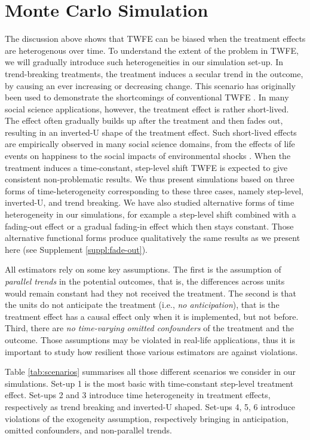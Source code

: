 \section{Monte Carlo Simulation}

The discussion above shows that TWFE can be biased when the treatment effects are heterogenous over time. To understand the extent of the problem in TWFE, we will gradually introduce such heterogeneities in our simulation set-up. In trend-breaking treatments, the treatment induces a secular trend in the outcome, by causing an ever increasing or decreasing change. This scenario has originally been used to demonstrate the shortcomings of conventional TWFE \cite{Callaway.2020,Goodman-Bacon.2021}. In many social science applications, however, the treatment effect is rather short-lived. The effect often gradually builds up after the treatment and then fades out, resulting in an inverted-U shape of the treatment effect. Such short-lived effects are empirically observed in many social science domains, from the effects of life events on happiness \cite{Bernardi.2017, Kratz.2020a, Clark.2013} to the social impacts of environmental shocks \cite{Baccini.2021, ConteKeivabu.2022, Currie.2015}. When the treatment induces a time-constant, step-level shift TWFE is expected to give consistent non-problematic results. We thus present simulations based on three forms of time-heterogeneity corresponding to these three cases, namely step-level, inverted-U, and trend breaking. We have also studied alternative forms of time heterogeneity in our simulations, for example a step-level shift combined with a fading-out effect or a gradual fading-in effect which then stays constant. Those alternative functional forms produce qualitatively the same results as we present here (see Supplement \ref{suppl:fade-out}).


All estimators rely on some key assumptions. The first is the assumption of \emph{parallel trends} in the potential outcomes, that is, the differences across units would remain constant had they not received the treatment. The second is that the units do not anticipate the treatment (i.e., \emph{no anticipation}), that is the treatment effect has a causal effect only when it is implemented, but not before. Third, there are \emph{no time-varying omitted confounders} of the treatment and the outcome. Those assumptions may be violated in real-life applications, thus it is important to study how resilient those various estimators are against violations. 

Table \ref{tab:scenarios} summarises all those different scenarios we consider in our simulations. Set-up 1 is the most basic with time-constant step-level treatment effect. Set-ups 2 and 3 introduce time heterogeneity in treatment effects, respectively as trend breaking and inverted-U shaped. Set-ups 4, 5, 6 introduce violations of the exogeneity assumption, respectively bringing in anticipation, omitted confounders, and non-parallel trends.

